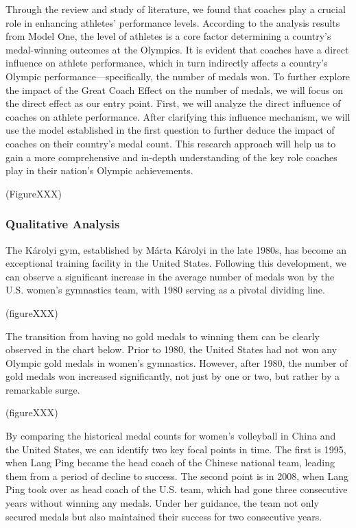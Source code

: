 \documentclass{mcmthesis}
\begin{document}
Through the review and study of literature, we found that coaches play a crucial role in enhancing athletes' performance levels. According to the analysis results from Model One, the level of athletes is a core factor determining a country's medal-winning outcomes at the Olympics. It is evident that coaches have a direct influence on athlete performance, which in turn indirectly affects a country's Olympic performance—specifically, the number of medals won.
To further explore the impact of the Great Coach Effect on the number of medals, we will focus on the direct effect as our entry point. First, we will analyze the direct influence of coaches on athlete performance. After clarifying this influence mechanism, we will use the model established in the first question to further deduce the impact of coaches on their country's medal count. This research approach will help us to gain a more comprehensive and in-depth understanding of the key role coaches play in their nation's Olympic achievements.

(FigureXXX)

\subsubsection{Qualitative Analysis}
The Károlyi gym, established by Márta Károlyi in the late 1980s, has become an exceptional training facility in the United States. Following this development, we can observe a significant increase in the average number of medals won by the U.S. women's gymnastics team, with 1980 serving as a pivotal dividing line.

(figureXXX)

The transition from having no gold medals to winning them can be clearly observed in the chart below. Prior to 1980, the United States had not won any Olympic gold medals in women's gymnastics. However, after 1980, the number of gold medals won increased significantly, not just by one or two, but rather by a remarkable surge.

(figureXXX)

By comparing the historical medal counts for women's volleyball in China and the United States, we can identify two key focal points in time. The first is 1995, when Lang Ping became the head coach of the Chinese national team, leading them from a period of decline to success. The second point is in 2008, when Lang Ping took over as head coach of the U.S. team, which had gone three consecutive years without winning any medals. Under her guidance, the team not only secured medals but also maintained their success for two consecutive years.
\end{document}
